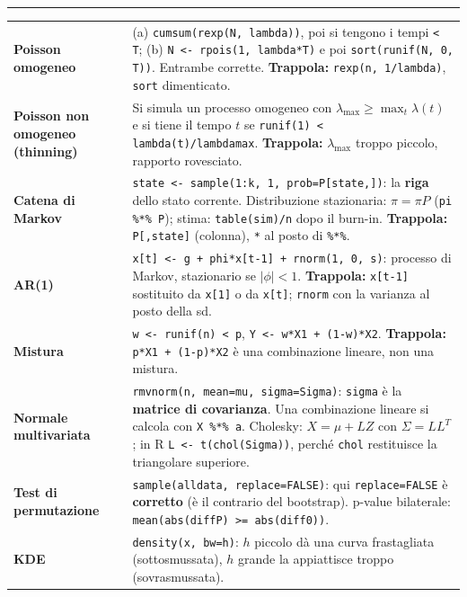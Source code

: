 \documentclass[10pt]{article}
\newcommand{\R}[1]{\texttt{#1}}
\newcommand{\trap}[1]{\textcolor{trap}{\textbf{Trappola:} #1}}
\renewcommand{\part}[1]{\par\vspace{8pt}{\Large\bfseries #1}\par\vspace{1pt}\hrule\vspace{2pt}}
\begin{document}
\part{B. Potrebbe chiedere (codice negli R-examples, mai uscito all'esame)}
{\small
\begin{tabularx}{\textwidth}{@{}p{3.1cm} X@{}}
\toprule
\textbf{Poisson omogeneo} & (a) \R{cumsum(rexp(N, lambda))}, poi si tengono i tempi \R{< T}; (b) \R{N <- rpois(1, lambda*T)} e poi \R{sort(runif(N, 0, T))}. Entrambe corrette. \trap{\R{rexp(n, 1/lambda)}, \R{sort} dimenticato.} \\
\textbf{Poisson non omogeneo (thinning)} & Si simula un processo omogeneo con $\lambda_{\max} \ge \max_t \lambda(t)$ e si tiene il tempo $t$ se \R{runif(1) < lambda(t)/lambdamax}. \trap{$\lambda_{\max}$ troppo piccolo, rapporto rovesciato.} \\
\textbf{Catena di Markov} & \R{state <- sample(1:k, 1, prob=P[state,])}: la \textbf{riga} dello stato corrente. Distribuzione stazionaria: $\pi = \pi P$ (\R{pi \%*\% P}); stima: \R{table(sim)/n} dopo il burn-in. \trap{\R{P[,state]} (colonna), \R{*} al posto di \R{\%*\%}.} \\
\textbf{AR(1)} & \R{x[t] <- g + phi*x[t-1] + rnorm(1, 0, s)}: processo di Markov, stazionario se $|\phi|<1$. \trap{\R{x[t-1]} sostituito da \R{x[1]} o da \R{x[t]}; \R{rnorm} con la varianza al posto della sd.} \\
\textbf{Mistura} & \R{w <- runif(n) < p}, \R{Y <- w*X1 + (1-w)*X2}. \trap{\R{p*X1 + (1-p)*X2} è una combinazione lineare, non una mistura.} \\
\textbf{Normale multivariata} & \R{rmvnorm(n, mean=mu, sigma=Sigma)}: \R{sigma} è la \textbf{matrice di covarianza}. Una combinazione lineare si calcola con \R{X \%*\% a}. Cholesky: $X = \mu + LZ$ con $\Sigma = LL^T$; in R \R{L <- t(chol(Sigma))}, perché \R{chol} restituisce la triangolare superiore. \\
\textbf{Test di permutazione} & \R{sample(alldata, replace=FALSE)}: qui \R{replace=FALSE} è \textbf{corretto} (è il contrario del bootstrap). p-value bilaterale: \R{mean(abs(diffP) >= abs(diff0))}. \\
\textbf{KDE} & \R{density(x, bw=h)}: $h$ piccolo dà una curva frastagliata (sottosmussata), $h$ grande la appiattisce troppo (sovrasmussata). \\
\bottomrule
\end{tabularx}}
\end{document}
